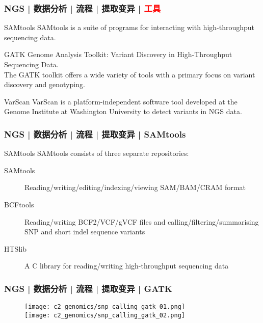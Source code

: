 \begin{frame}
  \frametitle{NGS | 数据分析 | 流程 | 提取变异 | \textcolor{red}{工具}}
  \begin{block}{SAMtools}
    SAMtools is a suite of programs for interacting with high-throughput sequencing data.
  \end{block}
  \pause
  \begin{block}{GATK}
    Genome Analysis Toolkit: Variant Discovery in High-Throughput Sequencing Data.\\
    The GATK toolkit offers a wide variety of tools with a primary focus on variant discovery and genotyping.
  \end{block}
  \pause
  \begin{block}{VarScan}
    VarScan is a platform-independent software tool developed at the Genome Institute at Washington University to detect variants in NGS data.
  \end{block}
\end{frame}

\begin{frame}
  \frametitle{NGS | 数据分析 | 流程 | 提取变异 | SAMtools}
  \begin{block}{SAMtools}
    SAMtools consists of three separate repositories:
    \begin{description}
      \item[SAMtools] Reading/writing/editing/indexing/viewing SAM/BAM/CRAM format
      \item[BCFtools] Reading/writing BCF2/VCF/gVCF files and calling/filtering/summarising SNP and short indel sequence variants
      \item[HTSlib] A C library for reading/writing high-throughput sequencing data
    \end{description}
  \end{block}
\end{frame}

\begin{frame}
  \frametitle{NGS | 数据分析 | 流程 | 提取变异 | GATK}
  \begin{figure}
    \centering
    \texttt{[image: c2\_genomics/snp\_calling\_gatk\_01.png]}\\
    \vspace{1em}
    \texttt{[image: c2\_genomics/snp\_calling\_gatk\_02.png]}
  \end{figure}
\end{frame}

